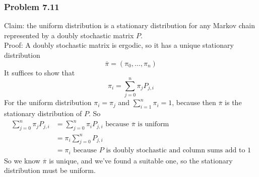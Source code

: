 \documentclass[12pt,letterpaper]{article}
\newenvironment{answer}[1]{
  \subsubsection*{Problem #1}
}{\newpage}
\begin{document}
\begin{answer}{7.11}
Claim: the uniform distribution is a stationary distribution for any Markov chain represented by a doubly stochastic matrix $P$. \\
Proof: A doubly stochastic matrix is ergodic, so it has a unique stationary distribution
	$$\overline{\pi} = (\pi_0, \ldots, \pi_n)$$
It suffices to show that
	$$\pi_i = \sum_{j=0}^n \pi_j P_{j,i} $$
For the uniform distribution $\pi_i = \pi_j$ and $\sum_{i=1}^n \pi_i = 1$, because then $\overline{\pi}$ is the stationary distribution of $P$. So
	\begin{align*}
	\sum_{j=0}^n \pi_j P_{j,i} &= \sum_{j=0}^n \pi_i P_{j,i} \text{ because $\overline{\pi}$ is uniform} \\
		&= \pi_i \sum_{j=0}^n P_{j,i} \\
		&= \pi_i \text{ because $P$ is doubly stochastic and column sums add to 1}
	\end{align*}
So we know $\overline{\pi}$ is unique, and we've found a suitable one, so the stationary distribution must be uniform.
\end{answer}
\end{document}
